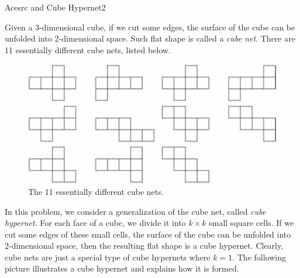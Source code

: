 \begin{Problem}{Acesrc and Cube Hypernet}{2}

Given a 3-dimensional cube, if we cut some edges, the surface of the cube can be unfolded into 2-dimensional space. Such flat shape is called a \textit{cube net}. There are 11 essentially different cube nets, listed below.

\begin{figure}[htb]
\centering
\includegraphics[width=12cm]{nets.jpg}
\caption{The 11 essentially different cube nets.}
\end{figure}

In this problem, we consider a generalization of the cube net, called \textit{cube hypernet}. For each face of a cube, we divide it into $k \times k$ small square cells. If we cut some edges of these small cells, the surface of the cube can be unfolded into 2-dimensional space, then the resulting flat shape is a cube hypernet. Clearly, cube nets are just a special type of cube hypernets where $k = 1$. The following picture illustrates a cube hypernet and explains how it is formed.

\begin{figure}[htb]
\centering


\end{figure}
\end{Problem}
